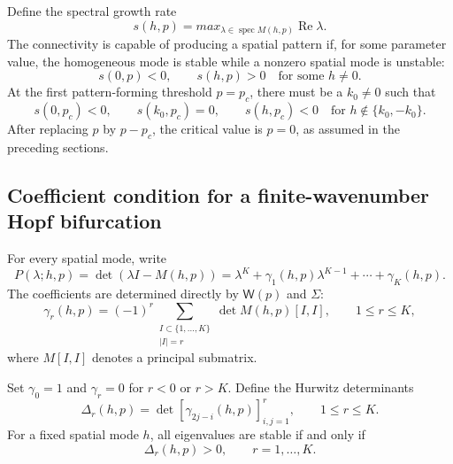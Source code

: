 Define the spectral growth rate
\begin{equation}
 s(h,p)=max_{\lambda\in\operatorname{spec}M(h,p)}
 \operatorname{Re}\lambda.
 \label{eq:K-spectral-growth}
\end{equation}
The connectivity is capable of producing a spatial pattern if, for some
parameter value, the homogeneous mode is stable while a nonzero spatial mode
is unstable:
\begin{equation}
 s(0,p)<0,
 \qquad
 s(h,p)>0
 \quad\text{for some }h\neq0.
 \label{eq:K-pattern-capability}
\end{equation}
At the first pattern-forming threshold $p=p_c$, there must be a
$k_0\neq0$ such that
\begin{equation}
 s(0,p_c)<0,
 \qquad
 s(k_0,p_c)=0,
 \qquad
 s(h,p_c)<0
 \quad\text{for }h\notin\{k_0,-k_0\}.
 \label{eq:K-first-pattern-threshold}
\end{equation}
After replacing $p$ by $p-p_c$, the critical value is $p=0$, as assumed in
the preceding sections.

\subsection{Coefficient condition for a finite-wavenumber Hopf bifurcation}

For every spatial mode, write
\begin{equation}
 P(\lambda;h,p)
 =\det\left(\lambda I-M(h,p)\right)
 =\lambda^K+\gamma_1(h,p)\lambda^{K-1}
 +\cdots+\gamma_K(h,p).
 \label{eq:K-characteristic-polynomial}
\end{equation}
The coefficients are determined directly by $\mathsf W(p)$ and $\Sigma$:
\begin{equation}
 \gamma_r(h,p)
 =(-1)^r
 \sum_{\substack{I\subset\{1,\ldots,K\}\\|I|=r}}
 \det M(h,p)[I,I],
 \qquad 1\leq r\leq K,
 \label{eq:K-characteristic-coefficients}
\end{equation}
where $M[I,I]$ denotes a principal submatrix.

Set $\gamma_0=1$ and $\gamma_r=0$ for $r<0$ or $r>K$.  Define the Hurwitz
determinants
\begin{equation}
 \Delta_r(h,p)
 =\det\left[\gamma_{2j-i}(h,p)\right]_{i,j=1}^{r},
 \qquad 1\leq r\leq K.
 \label{eq:K-Hurwitz-determinants}
\end{equation}
For a fixed spatial mode $h$, all eigenvalues are stable if and only if
\begin{equation}
 \Delta_r(h,p)>0,
 \qquad r=1,\ldots,K.
 \label{eq:K-Hurwitz-stability}
\end{equation}

